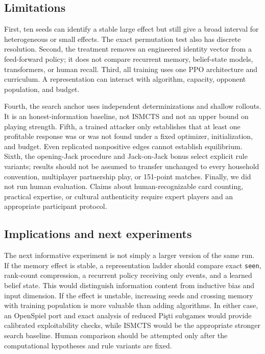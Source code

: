 \documentclass[10pt]{article}
\newcommand{\pisti}{Pişti}
\newcommand{\code}[1]{\texttt{#1}}
\begin{document}
\subsection{Limitations}

First, ten seeds can identify a stable large effect but still give a broad interval for heterogeneous or small effects. The exact permutation test also has discrete resolution. Second, the treatment removes an engineered identity vector from a feed-forward policy; it does not compare recurrent memory, belief-state models, transformers, or human recall. Third, all training uses one PPO architecture and curriculum. A representation can interact with algorithm, capacity, opponent population, and budget.

Fourth, the search anchor uses independent determinizations and shallow rollouts. It is an honest-information baseline, not ISMCTS and not an upper bound on playing strength. Fifth, a trained attacker only establishes that at least one profitable response was or was not found under a fixed optimizer, initialization, and budget. Even replicated nonpositive edges cannot establish equilibrium. Sixth, the opening-Jack procedure and Jack-on-Jack bonus select explicit rule variants; results should not be assumed to transfer unchanged to every household convention, multiplayer partnership play, or 151-point matches. Finally, we did not run human evaluation. Claims about human-recognizable card counting, practical expertise, or cultural authenticity require expert players and an appropriate participant protocol.

\subsection{Implications and next experiments}

The next informative experiment is not simply a larger version of the same run. If the memory effect is stable, a representation ladder should compare exact \code{seen}, rank-count compression, a recurrent policy receiving only events, and a learned belief state. This would distinguish information content from inductive bias and input dimension. If the effect is unstable, increasing seeds and crossing memory with training population is more valuable than adding algorithms. In either case, an OpenSpiel port and exact analysis of reduced \pisti{} subgames would provide calibrated exploitability checks, while ISMCTS would be the appropriate stronger search baseline. Human comparison should be attempted only after the computational hypotheses and rule variants are fixed.
\end{document}
